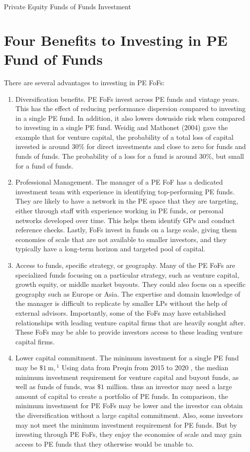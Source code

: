 \documentclass[11pt]{article}
\begin{document}
Private Equity Funds of Funds Investment

\section*{Four Benefits to Investing in PE Fund of Funds}
There are several advantages to investing in PE FoFs:

\begin{enumerate}
  \item Diversification benefits. PE FoFs invest across PE funds and vintage years. This has the effect of reducing performance dispersion compared to investing in a single PE fund. In addition, it also lowers downside risk when compared to investing in a single PE fund. Weidig and Mathonet (2004) gave the example that for venture capital, the probability of a total loss of capital invested is around $30 \%$ for direct investments and close to zero for funds and funds of funds. The probability of a loss for a fund is around $30 \%$, but small for a fund of funds.

  \item Professional Management. The manager of a PE FoF has a dedicated investment team with experience in identifying top-performing PE funds. They are likely to have a network in the PE space that they are targeting, either through staff with experience working in PE funds, or personal networks developed over time. This helps them identify GPs and conduct reference checks. Lastly, FoFs invest in funds on a large scale, giving them economies of scale that are not available to smaller investors, and they typically have a long-term horizon and targeted pool of capital.

  \item Access to funds, specific strategy, or geography. Many of the PE FoFs are specialized funds focusing on a particular strategy, such as venture capital, growth equity, or middle market buyouts. They could also focus on a specific geography such as Europe or Asia. The expertise and domain knowledge of the manager is difficult to replicate by smaller LPs without the help of external advisors. Importantly, some of the FoFs may have established relationships with leading venture capital firms that are heavily sought after. These FoFs may be able to provide investors access to these leading venture capital firms.

  \item Lower capital commitment. The minimum investment for a single PE fund may be $\$ 1 \mathrm{~m},{ }^{1}$ Using data from Preqin from 2015 to 2020 , the median minimum investment requirement for venture capital and buyout funds, as well as funds of funds, was $\$ 1$ million. thus an investor may need a large amount of capital to create a portfolio of PE funds. In comparison, the minimum investment for PE FoFs may be lower and the investor can obtain the diversification without a large capital commitment. Also, some investors may not meet the minimum investment requirement for PE funds. But by investing through PE FoFs, they enjoy the economies of scale and may gain access to PE funds that they otherwise would be unable to.

\end{enumerate}
\end{document}
